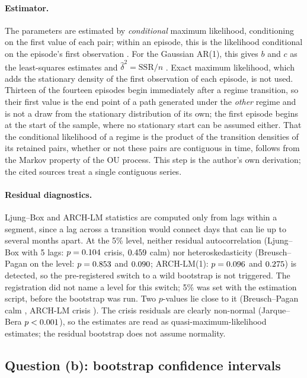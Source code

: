 \documentclass[11pt,a4paper]{article}
\begin{document}
\paragraph{Estimator.} The parameters are estimated by \emph{conditional} maximum likelihood, conditioning on the first value of each pair; within an episode, this is the likelihood conditional on the episode's first observation \citep[p.~6]{vandenberg2011}. For the Gaussian AR(1), this gives $b$ and $c$ as the least-squares estimates and $\hat\delta^2=\mathrm{SSR}/n$ \citetext{\citealp[p.~29, eqs.~58--60]{brigo2008}; \citealp[pp.~6, 9]{vandenberg2011}}. Exact maximum likelihood, which adds the stationary density of the first observation of each episode, is not used. Thirteen of the fourteen episodes begin immediately after a regime transition, so their first value is the end point of a path generated under the \emph{other} regime and is not a draw from the stationary distribution of its own; the first episode begins at the start of the sample, where no stationary start can be assumed either. That the conditional likelihood of a regime is the product of the transition densities of its retained pairs, whether or not these pairs are contiguous in time, follows from the Markov property of the OU process. This step is the author's own derivation; the cited sources treat a single contiguous series.

\paragraph{Residual diagnostics.} Ljung--Box and ARCH-LM statistics are computed only from lags within a segment, since a lag across a transition would connect days that can lie up to several months apart. At the 5\% level, neither residual autocorrelation (Ljung--Box with 5 lags: $p=0.104$ crisis, $0.459$ calm) nor heteroskedasticity (Breusch--Pagan on the level: $p=0.853$ and $0.090$; ARCH-LM(1): $p=0.096$ and $0.275$) is detected, so the pre-registered switch to a wild bootstrap is not triggered. The registration did not name a level for this switch; 5\% was set with the estimation script, before the bootstrap was run. Two $p$-values lie close to it (Breusch--Pagan calm \BPR, ARCH-LM crisis \ARCHK). The crisis residuals are clearly non-normal (Jarque--Bera $p<0.001$), so the estimates are read as quasi-maximum-likelihood estimates; the residual bootstrap does not assume normality.

\subsection{Question (b): bootstrap confidence intervals}\label{sec:bootstrap}
\end{document}
